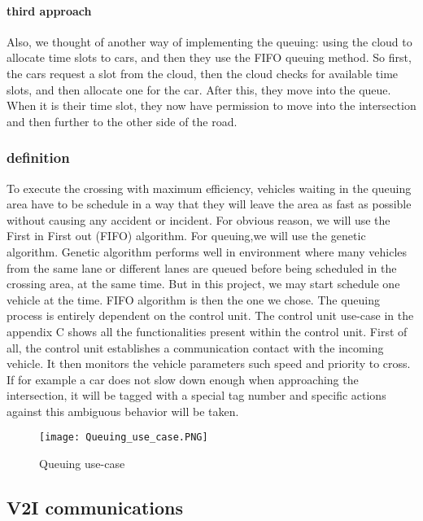 \documentclass[conference]{IEEEtran}
\begin{document}
\paragraph{third approach}
Also, we thought of another way of implementing the queuing: using the cloud to allocate time slots to cars, and then they use the FIFO queuing method. So first, the cars request a slot from the cloud, then the cloud checks for available time slots, and then allocate one for the car. After this, they move into the queue. When it is their time slot, they now have permission to move into the intersection and then further to the other side of the road.  

\subsubsection{definition}
To execute the crossing with maximum efficiency, vehicles waiting in the queuing area have to be schedule in a way that they will leave the area as fast as possible without causing any accident or incident. For obvious reason, we will use the First in First out (FIFO) algorithm. For queuing,we will use the genetic algorithm. Genetic algorithm performs well in environment where many vehicles from the same lane or different lanes are queued before being scheduled in the crossing area, at the same time. But in this project, we may start schedule one vehicle at the time. FIFO algorithm is then the one we chose.  \newline 
The queuing process is entirely dependent on the control unit. The control unit use-case in the appendix C shows all the functionalities present within the control unit. \newline
First of all, the control unit establishes a communication contact with the incoming vehicle. It then monitors the vehicle parameters such speed and priority to cross. If for example a car does not slow down enough when approaching the intersection, it will be tagged with a special tag number and specific actions against this ambiguous behavior will be taken. 

\begin{figure}[htp]
    \centering
    \texttt{[image: Queuing\_use\_case.PNG]}
    \caption{Queuing use-case}
    \label{fig:reg-gen}
\end{figure}


\subsection{V2I communications}
\end{document}
